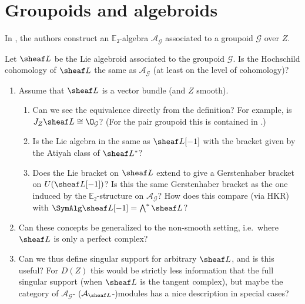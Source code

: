 \documentclass[english,no-theorem-numbers]{short-notes}
\begin{document}
\section{Groupoids and algebroids}

In \cite[Section~F.4]{ArinkinGaitsgory:arXiv:v2:SingularSupport}, the authors construct an $\mathbb E₂$-algebra $\mathcal A_{\mathcal G}$ associated to a groupoid $\mathcal G$ over $Z$.

\begin{Question}
    Let $\sheaf L$ be the Lie algebroid associated to the groupoid $\mathcal G$.
    Is the Hochschild cohomology of $\sheaf L$ the same as $\mathcal A_{\mathcal G}$ (at least on the level of cohomology)?
\end{Question}

\begin{enumerate}
    \item Assume that $\sheaf L$ is a vector bundle (and $Z$ smooth).
        \begin{enumerate}
            \item
                Can we see the equivalence directly from the definition?
                For example, is $J_Z\sheaf L \cong \O_{\mathcal G}$?
                (For the pair groupoid this is contained in \cite[Proposition~6.1]{CalaqueRossiVanDenBergh:2010:HochschildCohomologyForLieAlgebroids}.)
            \item
                Is the Lie algebra in \cite[Proposition G.1.7]{ArinkinGaitsgory:arXiv:v2:SingularSupport} the same as $\sheaf L[-1]$ with the bracket given by the Atiyah class of $\sheaf L^*$?
            \item
                Does the Lie bracket on $\sheaf L$ extend to give a Gerstenhaber bracket on $U(\sheaf L[-1])$?
                Is this the same Gerstenhaber bracket as the one induced by the $\mathbb E₂$-structure on $\mathcal A_{\mathcal G}$?
                How does this compare (via HKR) with $\SymAlg \sheaf L[-1] = \bigwedge^\ast \sheaf L$?
        \end{enumerate}
    \item Can these concepts be generalized to the non-smooth setting, i.e.~where $\sheaf L$ is only a perfect complex?
    \item Can we thus define singular support for arbitrary $\sheaf L$, and is this useful?
        For $D(Z)$ this would be strictly less information that the full singular support (when $\sheaf L$ is the tangent complex), but maybe the category of $\mathcal A_{\mathcal G}$- ($\mathcal A_{\sheaf L}$-)modules has a nice description in special cases?
\end{enumerate}

\printbibliography
\end{document}
